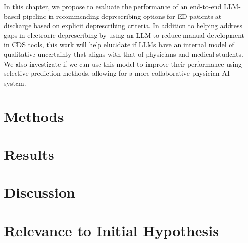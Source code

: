 In this chapter, we propose to evaluate the performance of an end-to-end LLM-based pipeline in recommending deprescribing options for ED patients at discharge based on explicit deprescribing criteria. In addition to helping address gaps in electronic deprescribing by using an LLM to reduce manual development in CDS tools, this work will  help elucidate if LLMs have an internal model of qualitative uncertainty that aligns with that of physicians and medical students. We also investigate if we can use this model to improve their performance using selective prediction methods, allowing for a more collaborative physician-AI system.



\section{Methods}



\section{Results}
\section{Discussion}
\section{Relevance to Initial Hypothesis}
